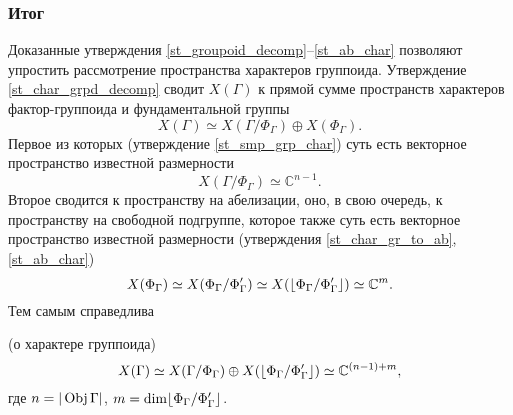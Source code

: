 \subsubsection{Итог}
Доказанные утверждения \ref{st_groupoid_decomp}--\ref{st_ab_char} 
позволяют упростить рассмотрение пространства характеров группоида.
Утверждение \ref{st_char_grpd_decomp} сводит $X(\Gamma)$ к прямой сумме 
пространств характеров фактор-группоида и фундаментальной группы 
\[X(\Gamma) \simeq X(\Gamma/\Phi_\Gamma)\oplus X(\Phi_\Gamma).\] 
Первое из которых (утверждение \ref{st_smp_grp_char}) суть есть векторное 
пространство известной размерности
\[X(\Gamma/\Phi_\Gamma) \simeq \mathbb{C}^{n-1}.\]
Второе сводится к пространству на абелизации, оно, в свою очередь, к 
пространству на свободной подгруппе, которое также суть есть векторное 
пространство известной размерности (утверждения \ref{st_char_gr_to_ab}, 
\ref{st_ab_char})
    \[X(\Phi_\Gamma) \simeq X(\Phi_\Gamma/\Phi_\Gamma') 
    \simeq X(\lfloor \Phi_\Gamma / \Phi_\Gamma' \rfloor) \simeq \mathbb{C}^m.\]
Тем самым справедлива
\begin{theorem} (о характере группоида)
    \[X(\Gamma) \simeq X(\Gamma/\Phi_\Gamma) 
    \oplus X(\lfloor \Phi_\Gamma / \Phi_\Gamma' \rfloor) \simeq \mathbb{C}^{(n-1)+m},\]
    где $n = | \operatorname*{Obj} \Gamma |$, $m = \dim \lfloor \Phi_\Gamma / \Phi_\Gamma' \rfloor$.
\end{theorem}